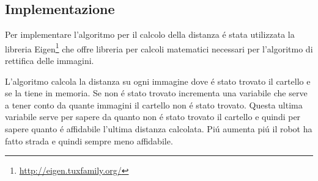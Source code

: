 	\subsection{Implementazione}
		Per implementare l'algoritmo per il calcolo della distanza \'e stata utilizzata la libreria Eigen\footnote{\url{ http://eigen.tuxfamily.org/}} che offre libreria per calcoli matematici necessari per l'algoritmo di rettifica delle immagini.

		L'algoritmo calcola la distanza su ogni immagine dove \'e stato trovato il cartello e se la tiene in memoria. Se non \'e stato trovato incrementa una variabile che serve a tener conto da quante immagini il cartello non \'e stato trovato. Questa ultima variabile serve per sapere da quanto non \'e stato trovato il cartello e quindi per sapere quanto \'e affidabile l'ultima distanza calcolata. Pi\'u aumenta pi\'u il robot ha fatto strada e quindi sempre meno affidabile.

